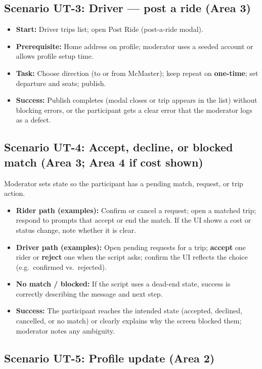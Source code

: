 \subsection{Scenario UT-3: Driver --- post a ride (Area 3)}

\begin{itemize}
  \item \textbf{Start:} Driver trips list; open Post Ride (post-a-ride modal).
  \item \textbf{Prerequisite:} Home address on profile; moderator uses a seeded account or allows profile setup time.
  \item \textbf{Task:} Choose direction (to or from McMaster); keep repeat on \textbf{one-time}; set departure and seats; publish.
  \item \textbf{Success:} Publish completes (modal closes or trip appears in the list) without blocking errors, or the participant gets a clear error that the moderator logs as a defect.
\end{itemize}

\subsection{Scenario UT-4: Accept, decline, or blocked match (Area 3; Area 4 if cost shown)}

Moderator sets state so the participant has a pending match, request, or trip action.

\begin{itemize}
  \item \textbf{Rider path (examples):} Confirm or cancel a request; open a matched trip; respond to prompts that accept or end the match. If the UI shows a cost or status change, note whether it is clear.
  \item \textbf{Driver path (examples):} Open pending requests for a trip; \textbf{accept} one rider or \textbf{reject} one when the script asks; confirm the UI reflects the choice (e.g.\ confirmed vs.\ rejected).
  \item \textbf{No match / blocked:} If the script uses a dead-end state, success is correctly describing the message and next step.
  \item \textbf{Success:} The participant reaches the intended state (accepted, declined, cancelled, or no match) or clearly explains why the screen blocked them; moderator notes any ambiguity.
\end{itemize}

\subsection{Scenario UT-5: Profile update (Area 2)}


